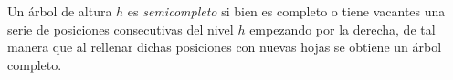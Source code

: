 \begin{center}
\end{center}

\begin{defi}\label{def semicompleto}
	Un árbol de altura $h$ es \textit{semicompleto} si bien es completo o tiene vacantes una serie de posiciones consecutivas del nivel $h$ empezando por la derecha, de tal manera que al rellenar dichas posiciones con nuevas hojas se obtiene un árbol completo.
\end{defi}

